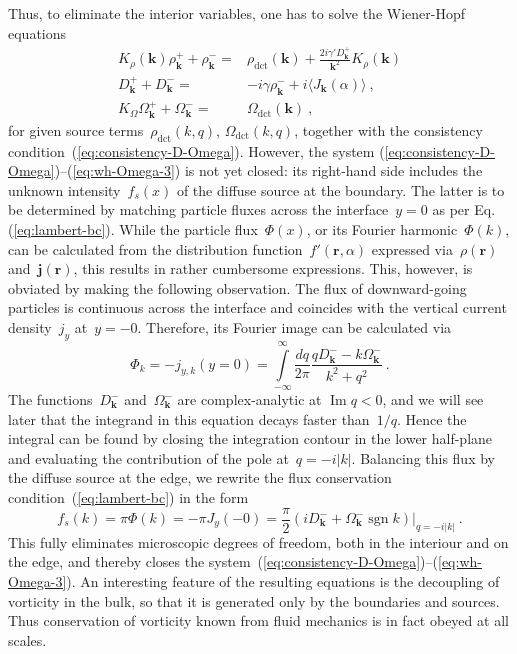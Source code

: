 \documentclass[preprint,aps,eqsecnum, prb]{revtex4-1}
\newcommand{\fplus}[1]{{#1}^{+}}
\newcommand{\fminus}[1]{{#1}^{-}}
\renewcommand{\Im}{\mathop{\mathrm{Im}}\nolimits}
\newcommand{\sgn}{\mathop{\mathrm{sgn}}\nolimits}
\newcommand{\dct}[1]{{#1}_\mathrm{dct}}
\begin{document}
Thus, to eliminate the interior variables,
one has to solve the Wiener-Hopf equations
\begin{align}
  \label{eq:wh-rho-3}
  K_\rho({\bm k}) \fplus{\rho}_{\bm k} + \fminus{\rho}_{\bm k}
  ={}& \dct{\rho}({\bm k}) + \frac{2 i \gamma' \fplus{D}_{\bm k}}{{\bm k}^2}
   K_\rho({\bm k})
  \\
  \label{eq:wh-D-3}
  \fplus{D}_{\bm k} + \fminus{D}_{\bm k}
  ={}& -i \gamma \fminus{\rho}_{\bm k} + i \langle J_{\bm k}(\alpha) \rangle \ ,
  \\
  \label{eq:wh-Omega-3}
  K_\Omega\fplus{\Omega}_{\bm k} + \fminus{\Omega}_{\bm k}
  ={}& \dct{\Omega}({\bm k})
  \ ,
\end{align}
for given source terms~$\dct{\rho}(k, q)$, $\dct{\Omega}(k, q)$,
together with the consistency condition~(\ref{eq:consistency-D-Omega}).
However, the system (\ref{eq:consistency-D-Omega})--(\ref{eq:wh-Omega-3})
is not yet closed:
its right-hand side includes the unknown intensity~$f_s(x)$
of the diffuse source at the boundary.
The latter is to be determined by matching particle fluxes across the
interface~$y = 0$ as per Eq.(\ref{eq:lambert-bc}).
While the particle flux~$\Phi(x)$, or its Fourier harmonic~$\Phi(k)$,
can be calculated from
the distribution function~$f'({\bm r}, \alpha)$ expressed
via~$\rho({\bm r})$ and~${\bm j}({\bm r})$,
this results in rather cumbersome expressions.
This, however, is obviated by making the following observation.
The flux of downward-going particles is continuous across the interface
and coincides with the vertical current density~$j_y$ at~$y = -0$.
Therefore, its Fourier image can be calculated via
\begin{equation}
  \Phi_{k} = -j_{y, k}(y=0)
  = \int\limits_{-\infty}^{\infty} \frac{dq}{2\pi}
          \frac{q \fminus{D}_{\bm k} - k\fminus{\Omega}_{\bm k}}{k^2 + q^2}
  \ .
\end{equation}
The functions~$\fminus{D}_{\bm k}$ and~$\fminus{\Omega}_{\bm k}$ are
complex-analytic at $\Im q < 0$, and we will see later that the integrand
in this equation decays faster than~$1/q$. Hence the integral can be found
by closing the integration contour in the lower half-plane and evaluating
the contribution of the pole at~$q = -i |k|$. Balancing this flux by the
diffuse source at the edge,
we rewrite the flux conservation condition~(\ref{eq:lambert-bc}) in the form
\begin{equation}
  \label{eq:Phi-D-Omega}
  f_s(k) = \pi\Phi(k) = - \pi J_y(-0) =  \frac{\pi}{2}
      \left.\left(i\fminus{D}_{\bm k}
           + \fminus{\Omega}_{\bm k} \sgn k\right)\right|_{q  = -i |k|}
  \ .
\end{equation}
This fully eliminates microscopic degrees of freedom, both in
the interiour and on the edge, and thereby
closes the system~(\ref{eq:consistency-D-Omega})--(\ref{eq:wh-Omega-3}).
An interesting feature of the resulting equations is the decoupling
of vorticity in the bulk, so that it is generated only by the
boundaries and sources. Thus conservation of vorticity known
from fluid mechanics is in fact obeyed at all scales.
\end{document}
